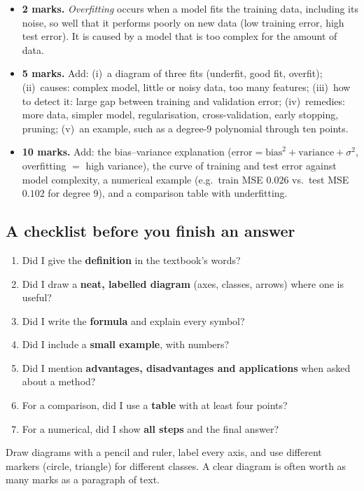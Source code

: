 \begin{itemize}
  \item \textbf{2 marks.} \emph{Overfitting} occurs when a model fits the training data, including its noise, so well that it performs poorly on new data (low training error, high test error). It is caused by a model that is too complex for the amount of data.
  \item \textbf{5 marks.} Add: (i)~a diagram of three fits (underfit, good fit, overfit); (ii)~causes: complex model, little or noisy data, too many features; (iii)~how to detect it: large gap between training and validation error; (iv)~remedies: more data, simpler model, regularisation, cross-validation, early stopping, pruning; (v)~an example, such as a degree-9 polynomial through ten points.
  \item \textbf{10 marks.} Add: the bias--variance explanation ($\text{error}=\text{bias}^2+\text{variance}+\sigma^2$, overfitting $=$ high variance), the curve of training and test error against model complexity, a numerical example (e.g.\ train MSE $0.026$ vs.\ test MSE $0.102$ for degree 9), and a comparison table with underfitting.
\end{itemize}

\subsection*{A checklist before you finish an answer}

\begin{enumerate}
  \item Did I give the \textbf{definition} in the textbook's words?
  \item Did I draw a \textbf{neat, labelled diagram} (axes, classes, arrows) where one is useful?
  \item Did I write the \textbf{formula} and explain every symbol?
  \item Did I include a \textbf{small example}, with numbers?
  \item Did I mention \textbf{advantages, disadvantages and applications} when asked about a method?
  \item For a comparison, did I use a \textbf{table} with at least four points?
  \item For a numerical, did I show \textbf{all steps} and the final answer?
\end{enumerate}

\begin{exam}
Draw diagrams with a pencil and ruler, label every axis, and use different markers (circle, triangle) for different classes. A clear diagram is often worth as many marks as a paragraph of text.
\end{exam}

